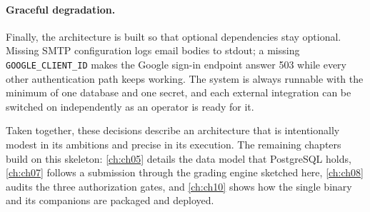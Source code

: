 \paragraph{Graceful degradation.} Finally, the architecture is built so that
optional dependencies stay optional. Missing SMTP configuration logs email
bodies to stdout; a missing \texttt{GOOGLE\_CLIENT\_ID} makes the Google
sign-in endpoint answer 503 while every other authentication path keeps working.
The system is always runnable with the minimum of one database and one secret,
and each external integration can be switched on independently as an operator is
ready for it.

\medskip

Taken together, these decisions describe an architecture that is intentionally
modest in its ambitions and precise in its execution. The remaining chapters
build on this skeleton: \cref{ch:ch05} details the data model that PostgreSQL
holds, \cref{ch:ch07} follows a submission through the grading engine sketched
here, \cref{ch:ch08} audits the three authorization gates, and \cref{ch:ch10}
shows how the single binary and its companions are packaged and deployed.
